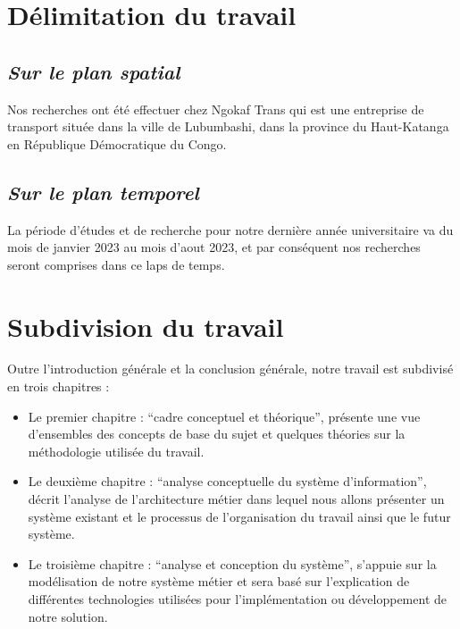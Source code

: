     \section[Délimitation du travail]{Délimitation du travail}
        \subsection[Sur le plan spatial]{\textit{Sur le plan spatial}}
        Nos recherches ont été effectuer chez Ngokaf Trans qui est une entreprise de transport
        située dans la ville de Lubumbashi, dans la province du Haut-Katanga en République Démocratique du Congo.
        \subsection[Sur le plan temporel]{\textit{Sur le plan temporel}}
        La période d’études et de recherche pour notre dernière 
        année universitaire va du mois de janvier 2023 au mois d’aout 2023,
        et par conséquent nos recherches seront comprises dans ce laps de temps.
    \section[Subdivision du travail]{Subdivision du travail}
    Outre l’introduction générale et la conclusion générale, notre travail est subdivisé
    en trois chapitres :
    \par
        \begin{itemize}
            \setlength{\itemsep}{0pt}
            \item [\ding{226}] Le premier chapitre : \enquote{cadre conceptuel et théorique}, présente une vue
            d’ensembles des concepts de base du sujet et quelques théories sur la méthodologie
            utilisée du travail.
            \item [\ding{226}] Le deuxième chapitre : \enquote{analyse conceptuelle du système d’information}, 
            décrit l’analyse de l’architecture métier dans lequel nous allons présenter un système existant
            et le processus de l’organisation du travail ainsi que le futur système.
            \item [\ding{226}] Le troisième chapitre : \enquote{analyse et conception du système}, s’appuie sur la
            modélisation de notre système métier et sera basé sur l’explication de différentes
            technologies utilisées pour l’implémentation ou développement de notre solution.          
        \end{itemize} 

